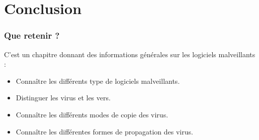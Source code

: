 \documentclass{beamer}
\begin{document}



\section{Conclusion}

\begin{frame}
  \frametitle{Que retenir ?}
  C'est un chapitre donnant des informations générales sur les logiciels malveillants : 
  \begin{itemize}
  \item Connaître les différents type de logiciels malveillants.
  \item Distinguer les virus et les vers.
  \item Connaître les différents modes de copie des virus.
    \item Connaître les différentes formes de propagation des virus.
    \end{itemize}
\end{frame}
\end{document}
